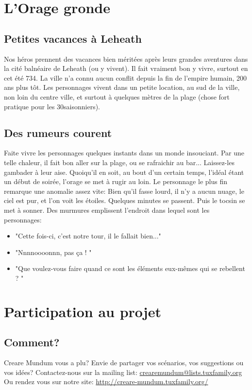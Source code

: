 \documentclass[a4paper]{article}
\begin{document}
\section{L'Orage gronde}
\subsection{Petites vacances à Leheath}
Nos héros prennent des vacances bien méritées après leurs grandes aventures dans la cité balnéaire de Leheath (ou y vivent). 
Il fait vraiment bon y vivre, surtout en cet été 734. La ville n'a connu aucun conflit depuis la fin de l'empire humain, 200 ans plus tôt.
\newline
Les personnages vivent dans un petite location, au sud de la ville, non loin du centre ville, et surtout à quelques mètres de la plage (chose fort pratique pour les 30\degre saisonniers).
\subsection{Des rumeurs courent}
Faite vivre les personnages quelques instants dans un monde insouciant. Par une telle chaleur, il fait bon aller sur la plage, ou se rafraichir au bar... Laissez-les gambader à leur aise. Quoiqu'il en soit, au bout d'un certain temps, l'idéal étant un début de soirée, l'orage se met à rugir au loin. 
\newline
Le personnage le plus fin remarque une anomalie assez vite: Bien qu'il fasse lourd, il n'y a aucun nuage, le ciel est pur, et l'on voit les étoiles. Quelques minutes se passent. Puis le tocsin se met à sonner. Des murmures emplissent l'endroit dans lequel sont les personnages:
\begin{itemize}
\item "Cette fois-ci, c'est notre tour, il le fallait bien..."
\item "Nnnnoooonnn, pas ça ! "
\item "Que voulez-vous faire quand ce sont les éléments eux-mêmes qui se rebellent ? "
\end{itemize}
\newline


\newpage
\section{Participation au projet}
\subsection{Comment?}
\hypertarget{participation}{}
Creare Mundum vous a plu? 
Envie de partager vos scénarios, vos suggestions ou vos idées?
\newline
Contactez-nous sur la mailing list: \href {mailto:crearemundum@lists.tuxfamily.org}{crearemundum@lists.tuxfamily.org}
\newline
Ou rendez vous sur notre site: \href {http://creare-mundum.tuxfamily.org/} {http://creare-mundum.tuxfamily.org/}
\end{document}
